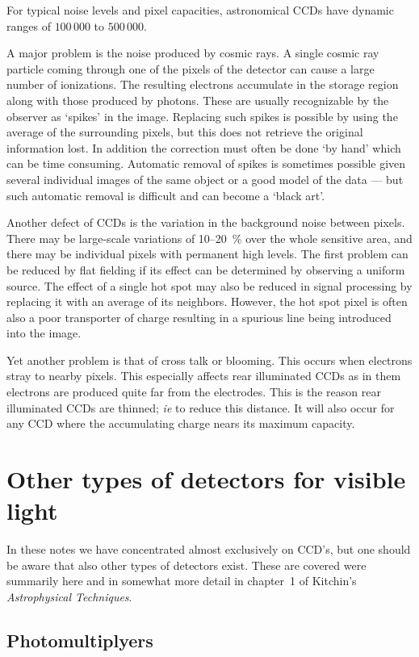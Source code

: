 For typical noise levels and pixel capacities, astronomical CCDs have dynamic
ranges of $100\,000$ to $500\,000$.

A major problem is the noise produced by cosmic rays. A single cosmic ray
particle coming through one of the pixels of the detector can cause a large
number of ionizations. The resulting electrons accumulate in the storage 
region along with those produced by photons. These are usually recognizable
by the observer as `spikes' in the image. Replacing such spikes is possible
by using the average of the surrounding pixels, but this does not retrieve 
the original information lost. In addition the correction must often be done
`by hand' which can be time consuming. Automatic removal of spikes is 
sometimes possible given several individual images of the same object or a 
good model of the data --- but such automatic removal is difficult and 
can become a `black art'. 

Another defect of CCDs is the variation in the background noise between 
pixels. There may be large-scale variations of 10--20~\% over the whole
sensitive area, and there may be individual pixels with permanent high levels.
The first problem can be reduced by flat fielding if its effect can be 
determined by observing a uniform source. The effect of a single hot spot
may also be reduced in signal processing by replacing it with an average of
its neighbors. However, the hot spot pixel is often also a poor transporter 
of charge resulting in a spurious line being introduced into the image.

Yet another problem is that of cross talk or blooming. This occurs when 
electrons stray to nearby pixels. This especially affects rear illuminated 
CCDs as in them electrons are produced quite far from the electrodes. This
is the reason rear illuminated CCDs are thinned; {\it ie} to reduce this 
distance. It will also occur for any CCD where the accumulating charge nears
its maximum capacity. 

\section{Other types of detectors for visible light}

In these notes we have concentrated almost exclusively on CCD's, but one should
be aware that also other types of detectors exist. These are covered were
summarily here and in somewhat more detail in chapter~1 of Kitchin's 
{\it Astrophysical Techniques}.

\subsection{Photomultiplyers}

